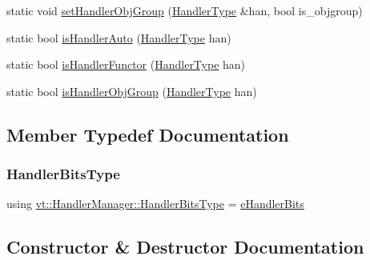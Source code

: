 \begin{DoxyCompactItemize}
static void \hyperlink{structvt_1_1_handler_manager_a0822ddaf90168e28fc9974e7f672b529}{set\+Handler\+Obj\+Group} (\hyperlink{namespacevt_af64846b57dfcaf104da3ef6967917573}{Handler\+Type} \&han, bool is\+\_\+objgroup)
\item 
static bool \hyperlink{structvt_1_1_handler_manager_a3324aeb71747bdd6b99194674dc03434}{is\+Handler\+Auto} (\hyperlink{namespacevt_af64846b57dfcaf104da3ef6967917573}{Handler\+Type} han)
\item 
static bool \hyperlink{structvt_1_1_handler_manager_a0d03f576b15390773522317a4086e725}{is\+Handler\+Functor} (\hyperlink{namespacevt_af64846b57dfcaf104da3ef6967917573}{Handler\+Type} han)
\item 
static bool \hyperlink{structvt_1_1_handler_manager_a41bb9a71156fa3010988e8b576022bf5}{is\+Handler\+Obj\+Group} (\hyperlink{namespacevt_af64846b57dfcaf104da3ef6967917573}{Handler\+Type} han)
\end{DoxyCompactItemize}


\subsection{Member Typedef Documentation}
\mbox{\label{structvt_1_1_handler_manager_ac2c93e168ab703b2441e0c38aa28a08f}} 
\subsubsection{\texorpdfstring{Handler\+Bits\+Type}{HandlerBitsType}}
{\footnotesize\ttfamily using \hyperlink{namespacevt_af182285b57b225b163d5d8aff03cb8c2}{vt\+::\+Handler\+Manager\+::\+Handler\+Bits\+Type} =  \hyperlink{namespacevt_af182285b57b225b163d5d8aff03cb8c2}{e\+Handler\+Bits}}



\subsection{Constructor \& Destructor Documentation}
\mbox{\label{structvt_1_1_handler_manager_ab14c2718685b0ecd93d39b129c597ec9}} 
